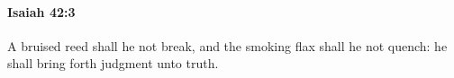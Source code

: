 
		\paragraph{Isaiah 42:3} %
			\label{ISAIAH-42-3}

			A bruised reed shall he not break, and the smoking flax shall he not quench: he shall bring forth judgment unto truth.


